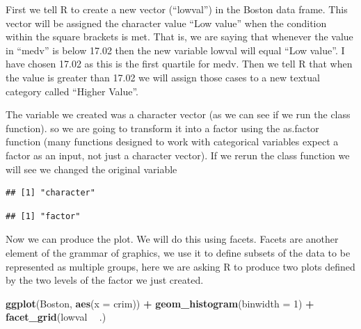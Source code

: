 \documentclass[]{book}
\newenvironment{Shaded}{\begin{snugshade}}{\end{snugshade}}
\newcommand{\DataTypeTok}[1]{\textcolor[rgb]{0.13,0.29,0.53}{#1}}
\newcommand{\DecValTok}[1]{\textcolor[rgb]{0.00,0.00,0.81}{#1}}
\newcommand{\KeywordTok}[1]{\textcolor[rgb]{0.13,0.29,0.53}{\textbf{#1}}}
\newcommand{\NormalTok}[1]{#1}
\newcommand{\OperatorTok}[1]{\textcolor[rgb]{0.81,0.36,0.00}{\textbf{#1}}}
\newcommand{\StringTok}[1]{\textcolor[rgb]{0.31,0.60,0.02}{#1}}
\theoremstyle{definition}
\theoremstyle{definition}
\theoremstyle{definition}
\theoremstyle{remark}
\begin{document}
First we tell R to create a new vector (``lowval'') in the Boston data
frame. This vector will be assigned the character value ``Low value''
when the condition within the square brackets is met. That is, we are
saying that whenever the value in ``medv'' is below 17.02 then the new
variable lowval will equal ``Low value''. I have chosen 17.02 as this is
the first quartile for medv. Then we tell R that when the value is
greater than 17.02 we will assign those cases to a new textual category
called ``Higher Value''.

The variable we created was a character vector (as we can see if we run
the class function). so we are going to transform it into a factor using
the as.factor function (many functions designed to work with categorical
variables expect a factor as an input, not just a character vector). If
we rerun the class function we will see we changed the original variable

\begin{Shaded}
\end{Shaded}

\begin{verbatim}
## [1] "character"
\end{verbatim}

\begin{Shaded}
\end{Shaded}

\begin{verbatim}
## [1] "factor"
\end{verbatim}

Now we can produce the plot. We will do this using facets. Facets are
another element of the grammar of graphics, we use it to define subsets
of the data to be represented as multiple groups, here we are asking R
to produce two plots defined by the two levels of the factor we just
created.

\begin{Shaded}
\begin{Highlighting}[]
\KeywordTok{ggplot}\NormalTok{(Boston, }\KeywordTok{aes}\NormalTok{(}\DataTypeTok{x =}\NormalTok{ crim)) }\OperatorTok{+}
\StringTok{  }\KeywordTok{geom_histogram}\NormalTok{(}\DataTypeTok{binwidth =} \DecValTok{1}\NormalTok{) }\OperatorTok{+}
\StringTok{  }\KeywordTok{facet_grid}\NormalTok{(lowval }\OperatorTok{~}\StringTok{ }\NormalTok{.) }
\end{Highlighting}
\end{Shaded}
\end{document}

